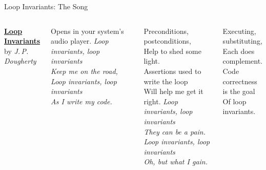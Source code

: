 \documentclass[10pt,aspectratio=169,xcolor=table]{beamer}
\begin{document}
\begin{frame}{Loop Invariants: The Song}
  \begin{columns}[T]
      \href{http://www.haverford.edu/computerscience/resources/songs/}{\textbf{Loop Invariants}}\\
      by \textit{J.\,P. Dougherty}\par\medskip
      \par\medskip
      {\scriptsize\color{crater} Opens in your system's audio player.}
      \footnotesize\itshape
      Loop invariants, loop invariants\\
      Keep me on the road,\\
      Loop invariants, loop invariants\\
      As I write my code.\par\medskip
      Preconditions, postconditions,\\
      Help to shed some light.\\
      Assertions used to write the loop\\
      Will help me get it right.
      \footnotesize\itshape
      Loop invariants, loop invariants\\
      They can be a pain.\\
      Loop invariants, loop invariants\\
      Oh, but what I gain.\par\medskip
      Executing, substituting,\\
      Each does complement.\\
      Code correctness is the goal\\
      Of loop invariants.
  \end{columns}
\end{frame}
\end{document}
